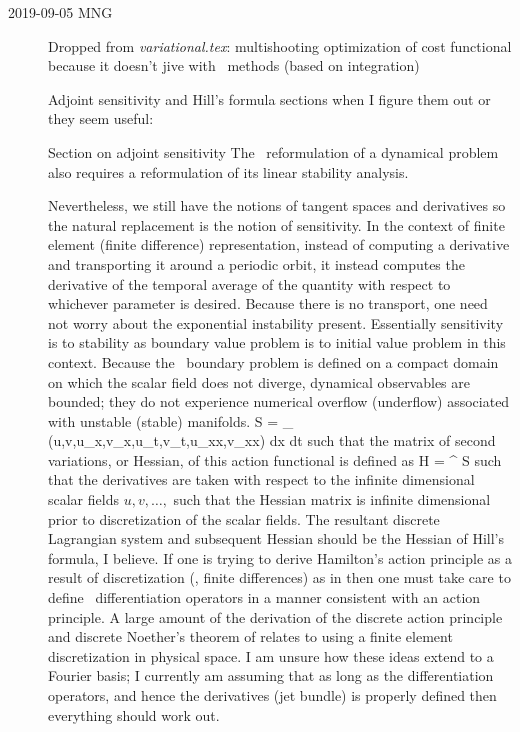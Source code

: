 \begin{description}
\item[2019-09-05 MNG] Dropped from \emph{variational.tex}:
{multishooting optimization of cost functional
because it doesn't jive with \spt\ methods (based on integration)}

{Adjoint sensitivity and Hill's formula sections
when I figure them out or they seem useful}:

Section on adjoint sensitivity
The \spt\ reformulation of a dynamical problem also
requires a reformulation of its linear stability
analysis.

Nevertheless, we still have the notions of tangent spaces and derivatives
so the natural replacement is the notion of sensitivity. In the context
of finite element (finite difference) representation, instead of computing
a derivative and transporting it around a periodic orbit, it instead
computes the derivative of the temporal average of the quantity with
respect to whichever parameter is desired.
Because there is no transport,
one need not worry about the exponential instability present.
Essentially sensitivity is to stability as boundary value problem is
to initial value problem in this context. Because the \spt\ boundary
problem is defined on a compact domain on which the scalar field does
not diverge, dynamical observables are bounded; they do not experience
numerical overflow (underflow) associated with unstable (stable) manifolds.
\beq
S = \int_{} (u,v,u_x,v_x,u_t,v_t,u_xx,v_xx) dx dt
\eeq
such that the matrix of second variations, or Hessian, of this action functional
is defined as
\beq
H = \nabla \nabla^{\top} S
\eeq
such that the derivatives are taken with respect to the infinite dimensional
scalar fields $u,v,\dots,$ such that the Hessian matrix is infinite dimensional
prior to discretization of the scalar fields.
The resultant discrete Lagrangian system and subsequent Hessian should be
the Hessian of Hill's formula, I believe. If one is trying to derive
Hamilton's action principle as a result of discretization (\ie, finite differences)
as in  then one must take care to define \spt\ differentiation operators
in a manner consistent with an action principle. A large amount of
the derivation of the discrete action principle and discrete Noether's theorem
of relates to using a finite element discretization in physical
space. I am unsure how these ideas extend to a Fourier basis; I currently
am assuming that as long as the differentiation operators, and hence the derivatives
(jet bundle) is properly defined then everything should work out.

\end{description}
